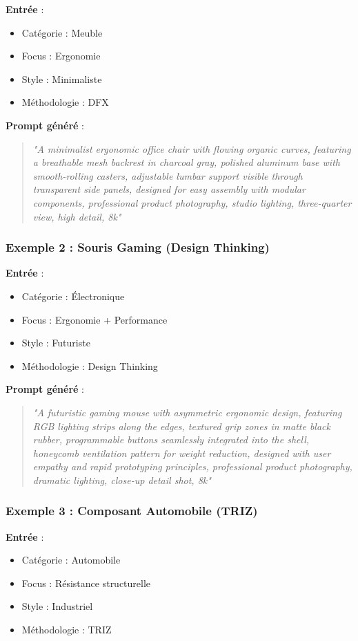 \textbf{Entrée} :
\begin{itemize}
    \item Catégorie : Meuble
    \item Focus : Ergonomie
    \item Style : Minimaliste
    \item Méthodologie : DFX
\end{itemize}

\textbf{Prompt généré} :
\begin{quote}
\textit{"A minimalist ergonomic office chair with flowing organic curves, featuring a breathable mesh backrest in charcoal gray, polished aluminum base with smooth-rolling casters, adjustable lumbar support visible through transparent side panels, designed for easy assembly with modular components, professional product photography, studio lighting, three-quarter view, high detail, 8k"}
\end{quote}

\subsubsection{Exemple 2 : Souris Gaming (Design Thinking)}

\textbf{Entrée} :
\begin{itemize}
    \item Catégorie : Électronique
    \item Focus : Ergonomie + Performance
    \item Style : Futuriste
    \item Méthodologie : Design Thinking
\end{itemize}

\textbf{Prompt généré} :
\begin{quote}
\textit{"A futuristic gaming mouse with asymmetric ergonomic design, featuring RGB lighting strips along the edges, textured grip zones in matte black rubber, programmable buttons seamlessly integrated into the shell, honeycomb ventilation pattern for weight reduction, designed with user empathy and rapid prototyping principles, professional product photography, dramatic lighting, close-up detail shot, 8k"}
\end{quote}

\subsubsection{Exemple 3 : Composant Automobile (TRIZ)}

\textbf{Entrée} :
\begin{itemize}
    \item Catégorie : Automobile
    \item Focus : Résistance structurelle
    \item Style : Industriel
    \item Méthodologie : TRIZ
\end{itemize}

